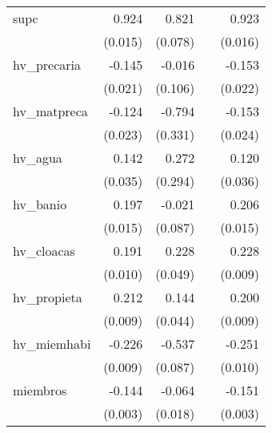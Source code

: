{\begin{longtable}{l*{4}{D{.}{.}{-1}}}
\addlinespace
supc        &       0.924\sym{***}&       0.821\sym{***}&                     &       0.923\sym{***}\\
            &     (0.015)         &     (0.078)         &                     &     (0.016)         \\
\addlinespace
hv\_precaria &      -0.145\sym{***}&      -0.016         &                     &      -0.153\sym{***}\\
            &     (0.021)         &     (0.106)         &                     &     (0.022)         \\
\addlinespace
hv\_matpreca &      -0.124\sym{***}&      -0.794\sym{*}  &                     &      -0.153\sym{***}\\
            &     (0.023)         &     (0.331)         &                     &     (0.024)         \\
\addlinespace
hv\_agua     &       0.142\sym{***}&       0.272         &                     &       0.120\sym{***}\\
            &     (0.035)         &     (0.294)         &                     &     (0.036)         \\
\addlinespace
hv\_banio    &       0.197\sym{***}&      -0.021         &                     &       0.206\sym{***}\\
            &     (0.015)         &     (0.087)         &                     &     (0.015)         \\
\addlinespace
hv\_cloacas  &       0.191\sym{***}&       0.228\sym{***}&                     &       0.228\sym{***}\\
            &     (0.010)         &     (0.049)         &                     &     (0.009)         \\
\addlinespace
hv\_propieta &       0.212\sym{***}&       0.144\sym{**} &                     &       0.200\sym{***}\\
            &     (0.009)         &     (0.044)         &                     &     (0.009)         \\
\addlinespace
hv\_miemhabi &      -0.226\sym{***}&      -0.537\sym{***}&                     &      -0.251\sym{***}\\
            &     (0.009)         &     (0.087)         &                     &     (0.010)         \\
\addlinespace
miembros    &      -0.144\sym{***}&      -0.064\sym{***}&                     &      -0.151\sym{***}\\
            &     (0.003)         &     (0.018)         &                     &     (0.003)         \\

\end{longtable}}
